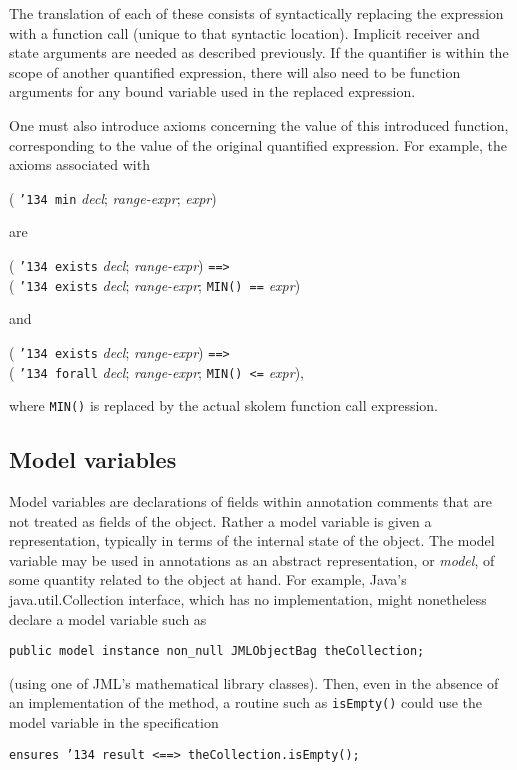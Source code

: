 \documentclass{sig-alternate}
\begin{document}
The translation of each of these consists of syntactically replacing the expression with a
function call (unique to that syntactic location).  Implicit receiver and state arguments are needed
as described previously.  If the quantifier is within the scope of another quantified
expression, there will also need to be function arguments for any bound variable used
in the replaced expression.

One must also introduce axioms concerning the value of this introduced function, 
corresponding to the value of the original quantified expression.  For example, the
axioms associated with
\begin{center} ( \texttt{\char'134 min} {\em decl}; {\em range-expr}; {\em expr}) \end{center}
are 
\begin{center} ( \texttt{\char'134 exists} {\em decl}; {\em range-expr}) \texttt{==>} \\
( \texttt{\char'134 exists} {\em decl}; {\em range-expr}; \texttt{MIN() ==} {\em expr}) \end{center}
and
\begin{center} ( \texttt{\char'134 exists} {\em decl}; {\em range-expr}) \texttt{==>} \\
( \texttt{\char'134 forall} {\em decl}; {\em range-expr}; \texttt{MIN() <=} {\em expr}), \end{center}
where \texttt{MIN()} is replaced by the actual skolem function call expression.


\subsection{Model variables}

Model variables are declarations of fields within annotation comments that are not treated
as fields of the object.  Rather a model variable is given a representation, typically in 
terms of the internal state of the object.  The model variable may be used in annotations
as an abstract representation, or {\em model}, of some quantity related to the object at hand.
For example, Java's java.util.Collection interface, which has no implementation, might 
nonetheless declare a model variable such as
\begin{center} \texttt{public model instance non\_null JMLObjectBag theCollection;} \end{center}
(using one of JML's mathematical library classes).  Then, even in the absence of an implementation of the method, a routine such as 
\texttt{isEmpty()} could use the model variable in the specification
\begin{center} \texttt{ensures \char'134 result <==> theCollection.isEmpty();} \end{center}
\end{document}
